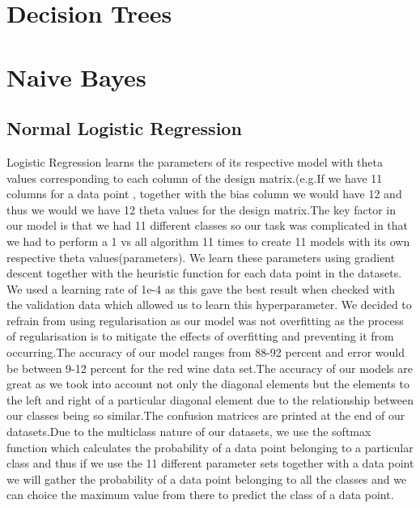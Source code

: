 \documentclass{article}
\begin{document}
\section{Decision Trees}

\section{Naive Bayes}


\subsection{Normal Logistic Regression}
Logistic Regression learns the parameters of its respective model with theta values corresponding to each column of the design matrix.(e.g.If we have 11 columns for a data point , together with the bias column we would have 12 and thus we would we have 12 theta values for the design matrix.The key factor in our model is that we had 11 different classes so our task was complicated in that we had to perform a 1 vs all algorithm 11 times to create 11 models with its own respective theta values(parameters). We learn these parameters using gradient descent together with the heuristic function for each data point in the datasets. We used a learning rate of 1e-4 as this gave the best result when checked with the validation data which allowed us to learn this hyperparameter. We decided to refrain from using regularisation as our model was not overfitting as the process of regularisation is to mitigate the effects of overfitting and preventing it from occurring.The accuracy of our model ranges from 88-92 percent and error would be between 9-12 percent for the red wine data set.The accuracy of our models are great as we took into account not only the diagonal elements but the elements to the left and right of a particular diagonal element due to the relationship between our classes being so similar.The confusion matrices are printed at the end of our datasets.Due to the multiclass nature of our datasets, we use the softmax function which calculates the probability of a data point belonging to a particular class and thus if we use the 11 different parameter sets together with a data point we will gather the probability of a data point belonging to all the classes and we can choice the maximum value from there to predict the class of a data point.
\end{document}
